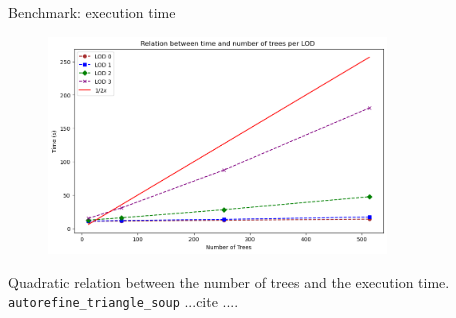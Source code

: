 \documentclass[10pt]{beamer}
\begin{document}
\begin{frame}{Benchmark: execution time}
  \begin{figure}[H]
    \centering
    \includegraphics[width=0.8\textwidth]{images/bench_time_ntree_linear.png}
\end{figure}
Quadratic relation between the number of trees and the execution time.\\
\texttt{autorefine\_triangle\_soup} ...cite ....
\end{frame}




\end{document}
